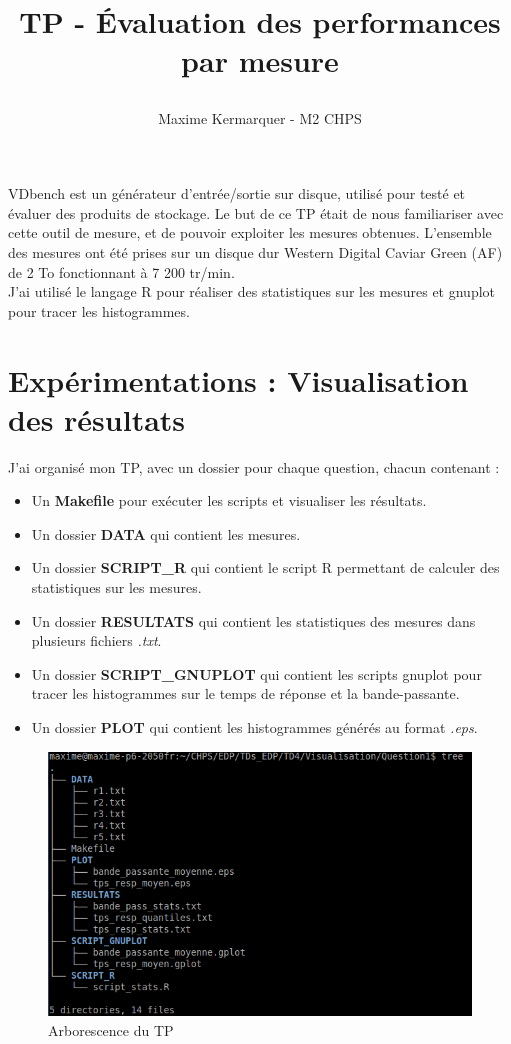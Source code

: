 \documentclass[a4paper]{article}
\title{
    \begin{minipage}\linewidth
        \centering\bfseries\sffamily
        TP - Évaluation des performances par mesure
    \end{minipage}}
\author{Maxime Kermarquer - M2 CHPS}
\date{}
\begin{document}
\maketitle

VDbench est un générateur d'entrée/sortie sur disque, utilisé pour testé et évaluer des produits de stockage.
Le but de ce TP était de nous familiariser avec cette outil de mesure, et de pouvoir exploiter les mesures obtenues. L'ensemble des mesures ont été prises sur un disque dur Western Digital Caviar Green (AF) de 2 To fonctionnant à 7 200 tr/min.\\
J'ai utilisé le langage R pour réaliser des statistiques sur les mesures et gnuplot pour tracer les histogrammes.

\section{Expérimentations : Visualisation des résultats}

J'ai organisé mon TP, avec un dossier pour chaque question, chacun contenant :
\begin{itemize}
\item Un \textbf{Makefile} pour exécuter les scripts et visualiser les résultats.
\item Un dossier \textbf{DATA} qui contient les mesures.
\item Un dossier \textbf{SCRIPT\_R} qui contient le script R permettant de calculer des statistiques sur les mesures.
\item Un dossier \textbf{RESULTATS} qui contient les statistiques des mesures dans plusieurs fichiers \emph{.txt}.
\item Un dossier \textbf{SCRIPT\_GNUPLOT} qui contient les scripts gnuplot pour tracer les histogrammes sur le temps de réponse et la bande-passante.
\item Un dossier \textbf{PLOT} qui contient les histogrammes générés au format \emph{.eps}.
\end{itemize}

\begin{figure}[h]
	\begin{center}
		\includegraphics[scale=0.55]{SCREEN/arborescence.png}
	\end{center}
   	\caption{Arborescence du TP}
	\label{fig:arbo}
\end{figure}
\end{document}

